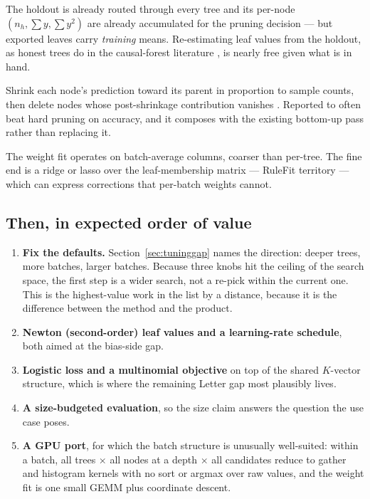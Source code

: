 \documentclass[11pt,a4paper]{article}
\theoremstyle{definition}
\begin{document}
\begin{description}[leftmargin=1.5em,style=nextline]
\item[Honest leaf values.] The holdout is already routed through every tree and
its per-node $(n_h, \sum y, \sum y^2)$ are already accumulated for the pruning
decision --- but exported leaves carry \emph{training} means. Re-estimating
leaf values from the holdout, as honest trees do in the causal-forest
literature \cite{wager2018causal}, is nearly free given what is in hand.
\item[Hierarchical shrinkage.] Shrink each node's prediction toward its parent
in proportion to sample counts, then delete nodes whose post-shrinkage
contribution vanishes \cite{agarwal2022hs}. Reported to often beat hard pruning
on accuracy, and it composes with the existing bottom-up pass rather than
replacing it.
\item[Leaf-level re-weighting.] The weight fit operates on batch-average
columns, coarser than per-tree. The fine end is a ridge or lasso over the
leaf-membership matrix --- RuleFit territory \cite{friedman2008rulefit} ---
which can express corrections that per-batch weights cannot.
\end{description}

\subsection{Then, in expected order of value}

\begin{enumerate}[leftmargin=1.5em,itemsep=1pt]
\item \textbf{Fix the defaults.} Section~\ref{sec:tuninggap} names the
direction: deeper trees, more batches, larger batches. Because three knobs hit
the ceiling of the search space, the first step is a wider search, not a
re-pick within the current one. This is the highest-value work in the list by a
distance, because it is the difference between the method and the product.
\item \textbf{Newton (second-order) leaf values and a learning-rate schedule},
both aimed at the bias-side gap.
\item \textbf{Logistic loss and a multinomial objective} on top of the shared
$K$-vector structure, which is where the remaining Letter gap most plausibly
lives.
\item \textbf{A size-budgeted evaluation}, so the size claim answers the
question the use case poses.
\item \textbf{A GPU port}, for which the batch structure is unusually
well-suited: within a batch, all trees $\times$ all nodes at a depth $\times$
all candidates reduce to gather and histogram kernels with no sort or argmax
over raw values, and the weight fit is one small GEMM plus coordinate descent.
\end{enumerate}
\end{document}
